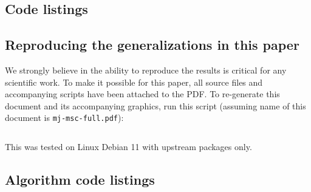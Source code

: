 \documentclass[a4paper]{article}
\begin{document}
\begin{appendices}

\section{Code listings}

\subsection{Reproducing the generalizations in this paper}

We strongly believe in the ability to reproduce the results is critical for any
    scientific work. To make it possible for this paper, all source files and
    accompanying scripts have been attached to the PDF. To re-generate this
    document and its accompanying graphics, run this script (assuming name of
    this document is {\tt mj-msc-full.pdf}):

\inputminted[fontsize=\small]{bash}{extract-and-generate}

This was tested on Linux Debian 11 with upstream packages only.

\subsection{Algorithm code listings}
\inputminted[fontsize=\small]{postgresql}{wm.sql}

\end{appendices}
\end{document}
